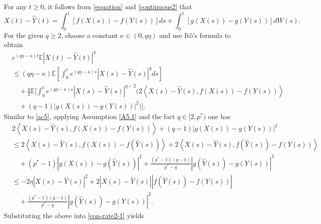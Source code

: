 \documentclass[10pt,a4paper]{amsart}
\renewenvironment{proof}{\noindent {\it  Proof.} \rm}{\pend}
\begin{document}
\begin{proof}
For any $t \ge 0$, it follows from \eqref{equation} and \eqref{continuous2} that
\begin{equation*}
	X(t) -  \hat Y(t) = \int_0^t {\left[ {f(X(s)) - f(Y(s))} \right]ds}  + \int_0^t {\left[ {g(X(s)) - g(Y(s))} \right]dW(s)} .
\end{equation*}
For the given $ q\ge 2$, choose a constant $\kappa \in (0, q \eta)$ and use It\^o's formula to obtain
\begin{equation}  \label{con-rate2-1}
\begin{split}  
	&{e^{\left( {q\eta  - \kappa } \right)t}}\mathbb{E}{\left| {X(t) - \hat Y(t)} \right|^q} \\
	&\le \left( {q\eta  - \kappa } \right)\mathbb{E}\left[ {\int_0^t {{e^{\left( {q\eta  - \kappa } \right)s}}{{\left| {X(s) - \hat Y(s)} \right|}^q}ds} } \right] \\
	&\quad+ \frac{q}{2}\mathbb{E}\Big[ {\int_0^t {{e^{\left( {q\eta  - \kappa } \right)s}}{{\left| {X(s) - \hat Y(s)} \right|}^{q - 2}}\Big( {2\left\langle {X(s) - \hat Y(s),f(X(s)) - f(Y(s))} \right\rangle } } }   \\
	& \quad  + (q - 1){{\left| {g(X(s)) - g(Y(s))} \right|}^2} \Big) \Big].\end{split}
\end{equation}
Similar to \eqref{ac5}, applying Assumption \ref{A5.1} and the fact $q \in [2, p^*)$ one has
\begin{equation*}
\begin{split}
	&2\left\langle {X(s) -  \hat Y(s),f(X(s)) - f(Y(s))} \right\rangle  + (q - 1){\left| {g(X(s)) - g(Y(s))} \right|^2} \\
	&\le  2\left\langle {X(s) - \hat Y(s),f(X(s)) - f(\hat Y(s))} \right\rangle  + 2\left\langle {X(s) - \hat Y(s),f(\hat Y(s)) - f(Y(s))} \right\rangle  \\
	&\quad + (p^* - 1){\left| {g(X(s)) - g(\hat Y(s))} \right|^2} + \frac{{(p^* - 1)(q - 1)}}{{p^* - q}}{\left| {g(\hat Y(s)) - g(Y(s))} \right|^2} \\
	&\le -2\eta {\left| {X(s) - \hat Y(s)} \right|^2} + 2\left| {X(s) - \hat Y(s)} \right|\left| {f(\hat Y(s)) - f(Y(s))} \right| \\
	&\quad+ \frac{{(p^* - 1)(q - 1)}}{{p^* - q}}{\left| {g(\hat Y(s)) - g(Y(s))} \right|^2}.
\end{split}
\end{equation*}
Substituting the above into \eqref{con-rate2-1} yields
\begin{equation}  \label{ce4}

\end{equation}
\end{proof}
\end{document}
